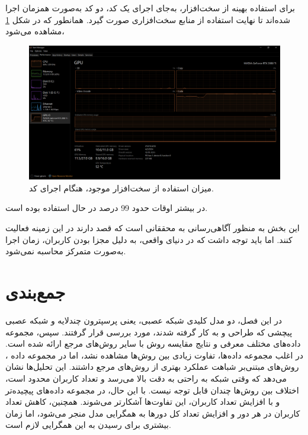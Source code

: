 برای استفاده بهینه از سخت‌افزار، به‌جای اجرای یک کد، دو کد به‌صورت همزمان اجرا شده‌اند تا نهایت استفاده از منابع سخت‌افزاری صورت گیرد. همانطور که در شکل
\ref{task_manager}
مشاهده می‌شود،
\begin{figure}[t!]
	\centering
	\includegraphics[scale=0.225]{images/chap5/task_manager_inverted_color.png}%
	\caption{%
		میزان استفاده از سخت‌افزار موجود، هنگام اجرای کد.
	}
	\label{task_manager}
	\centering
\end{figure}
در بیشتر اوقات حدود 99 درصد
%
در حال استفاده بوده است.



این بخش به منظور آگاهی‌رسانی به محققانی است که قصد دارند در این زمینه فعالیت کنند. اما باید توجه داشت که در دنیای واقعی، به دلیل مجزا بودن کاربران، زمان اجرا به‌صورت متمرکز محاسبه نمی‌شود.


\section{جمع‌بندی}
در این فصل، دو مدل کلیدی شبکه عصبی، یعنی پرسپترون چندلایه
و شبکه عصبی پیچشی
که طراحی و به کار گرفته شدند، مورد بررسی قرار گرفتند. سپس، مجموعه داده‌های مختلف معرفی و نتایج مقایسه روش 
با سایر روش‌های مرجع ارائه شده است. در اغلب مجموعه داده‌ها، تفاوت زیادی بین روش‌ها مشاهده نشد، اما در مجموعه داده 
%
، روش‌های مبتنی‌بر شباهت عملکرد بهتری از روش‌های مرجع داشتند. این تحلیل‌ها نشان می‌دهد که وقتی شبکه به راحتی به دقت بالا می‌رسد و تعداد کاربران محدود است، اختلاف بین روش‌ها چندان قابل توجه نیست. با این حال، در مجموعه داده‌های پیچیده‌تر و با افزایش تعداد کاربران، این تفاوت‌ها آشکارتر می‌شوند.
همچنین، کاهش تعداد کاربران در هر دور و افزایش تعداد کل دورها به همگرایی مدل منجر می‌شود، اما زمان بیشتری برای رسیدن به این همگرایی لازم است.
